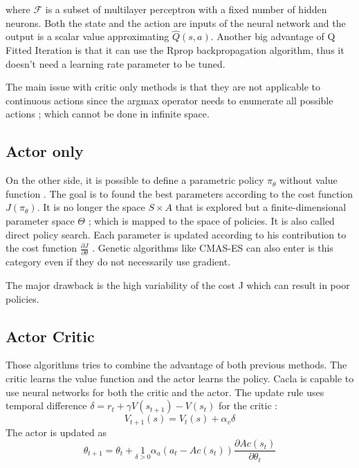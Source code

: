
where $\mathcal{F}$ is a subset of multilayer perceptron with a fixed number of hidden neurons.
Both the state and the action are inputs of the neural network and the output is a scalar value
approximating $\hat{Q}(s,a)$. Another big advantage of Q Fitted Iteration is that it can use
the Rprop \cite{Igel2000} backpropagation algorithm, thus it doesn't need a learning rate parameter
to be tuned.

The main issue with critic only methods is that they are not applicable to continuous actions since
the argmax operator needs to enumerate all possible actions ; which cannot be done in infinite space.

\subsection{Actor only}

On the other side, it is possible to define a parametric policy $\pi_{\theta}$ without value function \cite{Sutton1999}.
The goal is to found the best parameters according to the cost function $J(\pi_{\theta})$. It is no longer 
the space $S \times A$ that is explored but a finite-dimensional parameter space $\Theta$ ;
which is mapped to the space of policies. It is also called direct policy search.
Each parameter is updated according to his contribution to the cost function 
$ \frac{\partial J}{\partial \theta} $ \cite{Kober2010a}.
Genetic algorithms like CMAS-ES \cite{Hansen2001} can also enter is this category even if 
they do not necessarily use gradient.

The major drawback is the high variability of the cost J which can result in poor policies.

\subsection{Actor Critic}

Those algorithms \cite{Konda2003} tries to combine the advantage of both previous methods.
The critic learns the value function and the actor learns the policy.
Cacla \cite{VanHasselt2007a} is capable to use neural networks for both the critic and the actor.
The update rule uses temporal difference $\delta = r_t + \gamma V(s_{t+1}) - V(s_t)$ for the critic :
\begin{equation}
 V_{t+1}(s) = V_t(s) + \alpha_v \delta
\end{equation}
The actor is updated as
\begin{equation}
 \theta_{t+1} = \theta_t + \underset{\delta > 0}{\text{1}} \alpha_a (a_t - Ac(s_t))
 \frac{\partial Ac(s_t)}{\partial \theta_t}
\end{equation}

